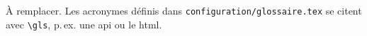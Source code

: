 \introduction

À remplacer. Les acronymes définis dans \texttt{configuration/glossaire.tex} se citent
avec \texttt{\textbackslash gls}, p.\,ex. une \gls{api} ou le \gls{html}.
